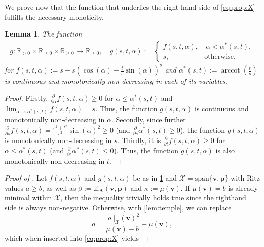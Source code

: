 \documentclass[a4paper,11pt,oneside]{amsart}
\DeclareMathOperator{\arccot}{arccot}
\newtheorem{lemma}[theorem]{Lemma}
\theoremstyle{definition}
\theoremstyle{remark}
\newcommand{\R}{\mathbb{R}}
\newcommand{\ten}[1]{\boldsymbol{#1}}
\numberwithin{equation}{section}
\numberwithin{theorem}{section}
\begin{document}
\begin{appendix}
%
%
%
%
%
%
%
%
%
%
%
We prove now that the function that underlies the right-hand side of \cref{eq:prop:X} fulfills the necessary monoticity.
\begin{lemma}\label{lem:gfun}
 The function 
 \begin{align*}
 g: \R_{> 0} \times \R_{\geq 0} \times \R_{\geq 0} \rightarrow \R_{\geq 0}, \quad g(s,t,\alpha) := \begin{cases}
                  f(s,t,\alpha), & \ \alpha < \alpha^\ast(s,t), \\
                  s, & \mbox{otherwise},
                 \end{cases}
\end{align*}
for $f(s,t,\alpha) :=  s - s ( \cos(\alpha) - \frac{t}{s} \sin(\alpha) )^2$ and $\alpha^\ast(s,t) := \arccot(\frac{t}{s})$ is continuous and monotonically non-decreasing in each of its variables.
%
%
%
%
%
\end{lemma}
\begin{proof}
%
%
 Firstly, $\frac{\partial}{\partial \alpha} f(s,t,\alpha) \geq 0$ for $\alpha \leq \alpha^\ast(s,t)$ and $\lim_{\alpha\rightarrow \alpha^\ast(s,t)} f(s,t,\alpha) = s$. Thus, the function $g(s,t,\alpha)$ is continuous and monotonically non-decreasing in $\alpha$.
 Secondly, since further $\frac{\partial}{\partial s} f(s,t,\alpha) = \frac{s^2 + t^2}{s^2} \sin(\alpha)^2 \geq 0$ (and $\frac{\partial}{\partial s} \alpha^\ast(s,t) \geq 0$), the function $g(s,t,\alpha)$ is monotonically non-decreasing in $s$. Thirdly, it is $\frac{\partial}{\partial t} f(s,t,\alpha) \geq 0$ for $\alpha \leq \alpha^\ast(s,t)$ (and $\frac{\partial}{\partial t} \alpha^\ast(s,t) \leq 0$). Thus, the function $g(s,t,\alpha)$ is also monotonically non-decreasing in $t$. 
\end{proof}
%
%
%
%
%
%
%
%
%
%
%
%
%
%
%
%
\begin{proof}[Proof of ]
Let $f(s,t,\alpha)$ and $g(s,t,\alpha)$ be as in \cref{lem:gfun} and $\mathcal{X} = \mathrm{span}\{\ten v,\ten p\}$ with Ritz values $a \geq b$, as well as $\beta := \angle_{\ten A}(\ten v, \ten p)$ and $\kappa := \mu(\ten v)$. If $\mu(\ten v) = b$ is already minimal within $\mathcal{X}$, then the inequality trivially holds true since the righthand side is always non-negative. Otherwise, with \cref{lem:temple}, we can replace
%
%
 \begin{equation}
  a = \frac{\varrho|_\mathcal{X}(\ten v)^2}{\mu(\ten v) - b} + \mu(\ten v),
 \end{equation}
%
which when inserted into \cref{eq:prop:X} yields 

\end{proof}
\end{appendix}
\end{document}
